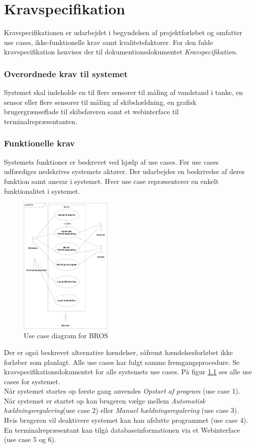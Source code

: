 \chapter{Kravspecifikation}
\label{ch:kravspecikikation}
Kravspecifikationen er udarbejdet i begyndelsen af projektforløbet og omfatter use cases, ikke-funktionelle krav samt kvalitetsfaktorer. For den fulde kravspecifikation henvises der til dokumentionsdokumentet \textit{Kravspecifikation}.

\subsection{Overordnede krav til systemet}
Systemet skal indeholde en til flere sensorer til måling af vandstand i tanke, en sensor eller flere sensorer til måling af skibshældning, en grafisk brugergrænseflade til skibsføreren samt et webinterface til terminalrepræsentanten.

\subsection{Funktionelle krav}
Systemets funktioner er beskrevet ved hjælp af use cases. Før use cases udfærdiges nedskrives systemets aktører. Der udarbejdes en beskrivelse af deres funktion samt ansvar i systemet. Hver use case repræsenterer en enkelt funktionalitet i systemet.
\begin{figure}[H]
\centering
\includegraphics[width=0.4\textwidth]{billeder/UCDBROS}
\caption{Use case diagram for BROS}
\label{fig:UCDBROS}
\end{figure}
Der er også beskrevet alternative hændelser, såfremt hændelsesforløbet ikke forløber som planlagt. Alle use cases har fulgt samme fremgangsprocedure. Se kravspecifikationsdokumentet for alle systemets use cases. På figur \ref{fig:UCDBROS} ses alle use cases for systemet.\\
Når systemet startes op første gang anvendes \textit{Opstart af program} (use case 1). Når systemet er startet op kan brugeren vælge mellem \textit{Automatisk hældningsregulering}(use case 2) eller \textit{Manuel hældningsregulering} (use case 3). Hvis brugeren vil deaktivere systemet kan han afslutte programmet (use case 4). En terminalrepræsentant kan tilgå databaseinformationen via et Webinterface (use case 5 og 6).


